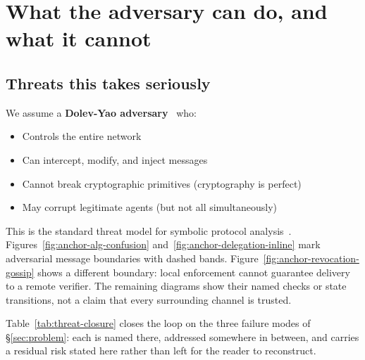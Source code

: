\documentclass[11pt,a4paper]{article}
\theoremstyle{definition}
\begin{document}
\section{What the adversary can do, and what it cannot}\label{sec:adversary}

\subsection{Threats this takes seriously}\label{sec:threat-model}

We assume a \textbf{Dolev-Yao adversary}~ who:
\begin{itemize}
  \item Controls the entire network
  \item Can intercept, modify, and inject messages
  \item Cannot break cryptographic primitives (cryptography is perfect)
  \item May corrupt legitimate agents (but not all simultaneously)
\end{itemize}

This is the standard threat model for symbolic protocol analysis~. Figures~\ref{fig:anchor-alg-confusion} and~\ref{fig:anchor-delegation-inline} mark adversarial message boundaries with dashed bands. Figure~\ref{fig:anchor-revocation-gossip} shows a different boundary: local enforcement cannot guarantee delivery to a remote verifier. The remaining diagrams show their named checks or state transitions, not a claim that every surrounding channel is trusted.

Table~\ref{tab:threat-closure} closes the loop on the three failure modes of \S\ref{sec:problem}: each is named there, addressed somewhere in between, and carries a residual risk stated here rather than left for the reader to reconstruct.
\end{document}
